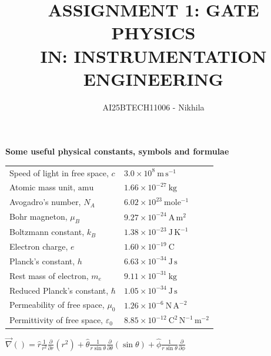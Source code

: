 \documentclass[journal,12pt,onecolumn]{IEEEtran}
\begin{document}
\title{
ASSIGNMENT 1: GATE PHYSICS \\
IN: INSTRUMENTATION ENGINEERING}
\author{AI25BTECH11006 - Nikhila }
\maketitle

\renewcommand{\thefigure}{\theenumi}
\renewcommand{\thetable}{\theenumi}

\vspace{6em} 



\noindent\textbf{\large Some useful physical constants, symbols and formulae}


\vspace{6em}

\begin{tabular}{ l l }
Speed of light in free space, $c$ & $3.0 \times 10^8\ \mathrm{m\,s^{-1}}$ \\
Atomic mass unit, $\mathrm{amu}$ & $1.66 \times 10^{-27}\ \mathrm{kg}$ \\
Avogadro's number, $N_A$ & $6.02 \times 10^{23}\ \mathrm{mole^{-1}}$ \\
Bohr magneton, $\mu_B$ & $9.27 \times 10^{-24}\ \mathrm{A\,m^2}$ \\
Boltzmann constant, $k_B$ & $1.38 \times 10^{-23}\ \mathrm{J\,K^{-1}}$ \\
Electron charge, $e$ & $1.60 \times 10^{-19}\ \mathrm{C}$ \\
Planck's constant, $h$ & $6.63 \times 10^{-34}\ \mathrm{J\,s}$ \\
Rest mass of electron, $m_e$ & $9.11 \times 10^{-31}\ \mathrm{kg}$ \\
Reduced Planck's constant, $\hbar$ & $1.05 \times 10^{-34}\ \mathrm{J\,s}$ \\
Permeability of free space, $\mu_0$ & $1.26 \times 10^{-6}\ \mathrm{N\,A^{-2}}$ \\
Permittivity of free space, $\varepsilon_0$ & $8.85 \times 10^{-12}\ \mathrm{C^2\,N^{-1}\,m^{-2}}$
\end{tabular}

\vspace{6em}
\noindent $\vec{\nabla}() = \hat{r} \frac{1}{r^2} \frac{\partial}{\partial r} \left( r^2 \right)
+ \hat{\theta} \frac{1}{r \sin\theta} \frac{\partial}{\partial \theta} (\sin\theta)
+ \hat{\phi} \frac{1}{r\sin\theta} \frac{\partial}{\partial\phi}$

\vspace{1em}
\end{document}
